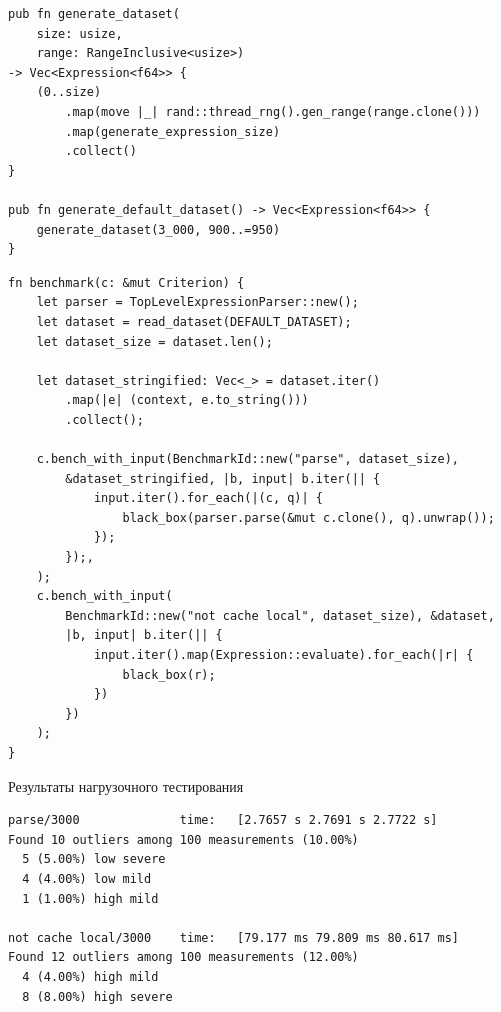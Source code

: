 \begin{frame}[fragile]
    \begin{verbatim}
pub fn generate_dataset(
    size: usize,
    range: RangeInclusive<usize>)
-> Vec<Expression<f64>> {
    (0..size)
        .map(move |_| rand::thread_rng().gen_range(range.clone()))
        .map(generate_expression_size)
        .collect()
}

pub fn generate_default_dataset() -> Vec<Expression<f64>> {
    generate_dataset(3_000, 900..=950)
}
    \end{verbatim}
\end{frame}

\begin{frame}[fragile]
    \begin{verbatim}
fn benchmark(c: &mut Criterion) {
    let parser = TopLevelExpressionParser::new();
    let dataset = read_dataset(DEFAULT_DATASET);
    let dataset_size = dataset.len();

    let dataset_stringified: Vec<_> = dataset.iter()
        .map(|e| (context, e.to_string()))
        .collect();

    c.bench_with_input(BenchmarkId::new("parse", dataset_size),
        &dataset_stringified, |b, input| b.iter(|| {
            input.iter().for_each(|(c, q)| {
                black_box(parser.parse(&mut c.clone(), q).unwrap());
            });
        });,
    );
    c.bench_with_input(
        BenchmarkId::new("not cache local", dataset_size), &dataset,
        |b, input| b.iter(|| {
            input.iter().map(Expression::evaluate).for_each(|r| {
                black_box(r);
            })
        })
    );
}
    \end{verbatim}
\end{frame}

\begin{frame}[fragile]{Результаты нагрузочного тестирования}
    \begin{lstlisting}[basicstyle=\fontsize{8pt}{12}\bf\ttfamily\color{black}]
parse/3000              time:   [2.7657 s 2.7691 s 2.7722 s]
Found 10 outliers among 100 measurements (10.00%)
  5 (5.00%) low severe
  4 (4.00%) low mild
  1 (1.00%) high mild

not cache local/3000    time:   [79.177 ms 79.809 ms 80.617 ms]
Found 12 outliers among 100 measurements (12.00%)
  4 (4.00%) high mild
  8 (8.00%) high severe
    \end{lstlisting}
\end{frame}

